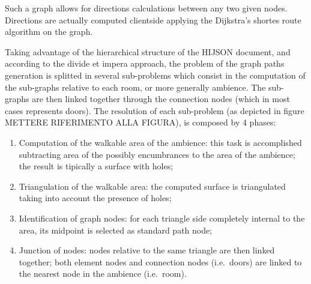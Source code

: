 \documentclass{sig-alternate}
\begin{document}
Such a graph allows for directions calculations between any two given
nodes. Directions are actually computed clientside applying the
Dijkstra's shortes route algorithm on the graph.

Taking advantage of the hierarchical structure of the HIJSON document,
and according to the divide et impera approach, the problem of the graph
paths generation is splitted in several sub-problems which consist in
the computation of the sub-graphs relative to each room, or more
generally ambience. The sub-graphs are then linked together through the
connection nodes (which in most cases represents doors). The resolution
of each sub-problem (as depicted in figure METTERE RIFERIMENTO ALLA
FIGURA), is composed by 4 phases:

\begin{enumerate}
\def\labelenumi{\arabic{enumi}.}
\itemsep1pt\parskip0pt
\item
  Computation of the walkable area of the ambience: this task is
  accomplished subtracting area of the possibly encumbrances to the area
  of the ambience; the result is tipically a surface with holes;
\item
  Triangulation of the walkable area: the computed surface is
  triangulated taking into account the presence of holes;
\item
  Identification of graph nodes: for each triangle side completely
  internal to the area, its midpoint is selected as standard path node;
\item
  Junction of nodes: nodes relative to the same triangle are then linked
  together; both element nodes and connection nodes (i.e.~doors) are
  linked to the nearest node in the ambience (i.e.~room).
\end{enumerate}
\end{document}
